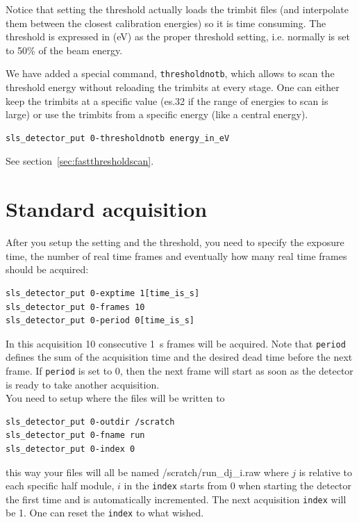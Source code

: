 \documentclass{article}
\begin{document}
Notice that setting the threshold actually loads the trimbit files (and interpolate them between the closest calibration energies) so it is time consuming. 
The threshold is expressed in (eV) as the proper threshold setting, i.e. normally is set to 50\% of the beam energy.  

We have added a special command, {\tt{thresholdnotb}}, which allows to scan the threshold energy without reloading the trimbits at every stage. One can either keep the trimbits at a specific value (es.32 if the range of energies to scan is large) or use the trimbits from a specific energy (like a central energy).
\begin{verbatim}
sls_detector_put 0-thresholdnotb energy_in_eV
\end{verbatim}
See section~\ref{sec:fastthresholdscan}.

\section{Standard acquisition}

After you setup the setting and the threshold, you need to specify the exposure time, the number of real time frames and eventually how many real time frames should be acquired:
\begin{verbatim}
sls_detector_put 0-exptime 1[time_is_s]
sls_detector_put 0-frames 10
sls_detector_put 0-period 0[time_is_s]
\end{verbatim}
In this acquisition 10 consecutive 1~s frames will be acquired. Note that {\tt{period}} defines the sum of the acquisition time and the desired dead time before the next frame. If {\tt{period}} is set to 0, then the next frame will start as soon as the detector is ready to take another acquisition. \\


You need to setup where the files will be written to
\begin{verbatim}
sls_detector_put 0-outdir /scratch
sls_detector_put 0-fname run
sls_detector_put 0-index 0
\end{verbatim}
this way your files will all be named /scratch/run\_dj\_i.raw where $j$ is relative to each specific half module, $i$ in the {\tt{index}} starts from 0 when starting the detector the first time and is automatically incremented. The next acquisition {\tt{index}} will be 1. One can reset the  {\tt{index}} to what wished.
\end{document}

